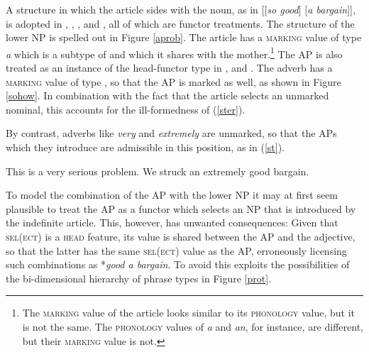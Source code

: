 \documentclass[output=paper
                ,modfonts
                ,nonflat
	        ,collection
	        ,collectionchapter
	        ,collectiontoclongg
 	        ,biblatex
                ,babelshorthands
                ,newtxmath
                ,draftmode
                ,colorlinks, citecolor=brown
]{./langsci/langscibook}
\begin{document}
A structure in which the article sides with the noun, as in [[\emph{so good}] [\emph{a bargain}]], 
is adopted in \citet{VanEynde07}, \citet{KimSells11}, \citet{KaySag12}, 
\citet{ArnoldSadler14} and \citet{VanEynde18}, all of which are functor treatments. 
The structure of the lower NP is spelled out in Figure \ref{aprob}. 
The article has a \textsc{marking} value of type \emph{a} which is a subtype of  and which it
shares with the mother.\footnote{The \textsc{marking} value of the article looks similar to its 
\textsc{phonology} value, but it is not the same. The \textsc{phonology} values of \emph{a} and \emph{an}, 
for instance, are different, but their \textsc{marking} value is not.} 
The AP is also treated as an instance of the head-functor type 
in \citet{VanEynde07}, \citet{KimSells11} and \citet{VanEynde18}. 
The adverb has a \textsc{marking} value of type , 
so that the AP is marked as well, as shown in Figure \ref{sohow}.   
In combination with the fact that the article selects an unmarked nominal, 
this accounts for the ill-formedness of (\ref{ster}). 

\begin{exe}
\ex\label{ster}
\begin{xlist}
\end{xlist}
\end{exe}

\noindent
By contrast, adverbs like \emph{very} and \emph{extremely} are unmarked,
so that the APs which they introduce are admissible in this position, as in (\ref{st}).  

\begin{exe}
\ex\label{st}
\begin{xlist}
\ex  This is a very serious problem. 
\ex  We struck an extremely good bargain. 
\end{xlist} 
\end{exe} 

To model the combination of the AP with the lower NP it may at first seem 
plausible to treat the AP as a functor which selects  
an NP that is introduced by the indefinite article. This, however, has 
unwanted consequences: Given that \textsc{sel(ect)} is a \textsc{head} feature, 
its value is shared between the AP and the adjective, so that the latter 
has the same \textsc{sel(ect)} value as the AP, erroneously licensing such 
combinations as *\emph{good a bargain}. To avoid this 
\citet{VanEynde18} exploits the possibilities of 
the bi-dimensional hierarchy of phrase types in Figure \ref{prot}. 
\end{document}
